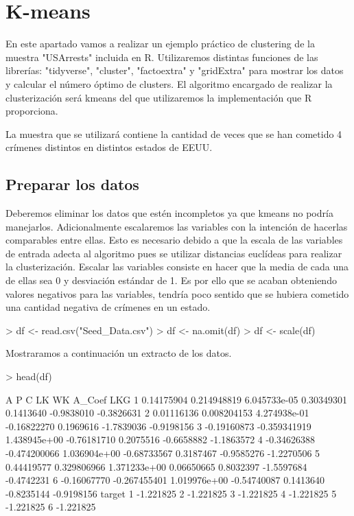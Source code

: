 \documentclass [a4paper] {article}
\begin{document}
\newpage
\section{K-means}
En este apartado vamos a realizar un ejemplo práctico de clustering de la muestra "USArrests" incluida en R.
Utilizaremos distintas funciones de las librerías: "tidyverse", "cluster", "factoextra" y "gridExtra" para mostrar los datos y calcular el número óptimo de clusters.
El algoritmo encargado de realizar la clusterización será kmeans del que utilizaremos la implementación que R proporciona.

La muestra que se utilizará contiene la cantidad de veces que se han cometido 4 crímenes distintos en distintos estados de EEUU.

\subsection{Preparar los datos}
Deberemos eliminar los datos que estén incompletos ya que kmeans no podría manejarlos.
Adicionalmente escalaremos las variables con la intención de hacerlas comparables entre ellas.
Esto es necesario debido a que la escala de las variables de entrada adecta al algoritmo pues se utilizar distancias euclídeas para realizar la clusterización.
Escalar las variables consiste en hacer que la media de cada una de ellas sea 0 y desviación estándar de 1.
Es por ello que se acaban obteniendo valores negativos para las variables, tendría poco sentido que se hubiera cometido una cantidad negativa de crímenes en un estado.
\begin{Schunk}
\begin{Sinput}
> df <- read.csv("Seed_Data.csv")
> df <- na.omit(df)
> df <- scale(df)
\end{Sinput}
\end{Schunk}
Mostraramos a continuación un extracto de los datos.
\begin{Schunk}
\begin{Sinput}
> head(df)
\end{Sinput}
\begin{Soutput}
            A            P            C          LK        WK     A_Coef        LKG
1  0.14175904  0.214948819 6.045733e-05  0.30349301 0.1413640 -0.9838010 -0.3826631
2  0.01116136  0.008204153 4.274938e-01 -0.16822270 0.1969616 -1.7839036 -0.9198156
3 -0.19160873 -0.359341919 1.438945e+00 -0.76181710 0.2075516 -0.6658882 -1.1863572
4 -0.34626388 -0.474200066 1.036904e+00 -0.68733567 0.3187467 -0.9585276 -1.2270506
5  0.44419577  0.329806966 1.371233e+00  0.06650665 0.8032397 -1.5597684 -0.4742231
6 -0.16067770 -0.267455401 1.019976e+00 -0.54740087 0.1413640 -0.8235144 -0.9198156
     target
1 -1.221825
2 -1.221825
3 -1.221825
4 -1.221825
5 -1.221825
6 -1.221825
\end{Soutput}
\end{Schunk}
\end{document}
